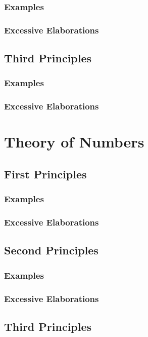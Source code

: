 \documentclass{book}
\begin{document}
\subsection{Examples}
\subsection{Excessive Elaborations}

\section{Third Principles}
\subsection{Examples}
\subsection{Excessive Elaborations}


\chapter{Theory of Numbers}

\section{First Principles}
\subsection{Examples}
\subsection{Excessive Elaborations}

\section{Second Principles}
\subsection{Examples}
\subsection{Excessive Elaborations}

\section{Third Principles}
\end{document}
